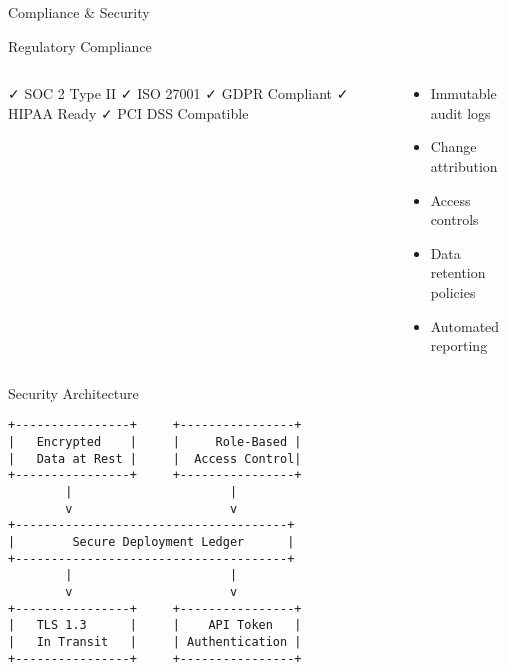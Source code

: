 \documentclass[presentation,aspectratio=169]{beamer}
\begin{document}
\begin{frame}[label={sec:org8612744},fragile]{Compliance \& Security}
 \begin{block}{Regulatory Compliance}
\begin{columns}
\begin{column}{0.5\columnwidth}
✓ SOC 2 Type II
✓ ISO 27001
✓ GDPR Compliant
✓ HIPAA Ready
✓ PCI DSS Compatible
\end{column}
\begin{column}{0.5\columnwidth}
\begin{itemize}
\item Immutable audit logs
\item Change attribution
\item Access controls
\item Data retention policies
\item Automated reporting
\end{itemize}
\end{column}
\end{columns}
\end{block}
\begin{block}{Security Architecture}
\begin{verbatim}
+----------------+     +----------------+
|   Encrypted    |     |     Role-Based |
|   Data at Rest |     |  Access Control|
+----------------+     +----------------+
        |                      |
        v                      v
+--------------------------------------+
|        Secure Deployment Ledger      |
+--------------------------------------+
        |                      |
        v                      v
+----------------+     +----------------+
|   TLS 1.3      |     |    API Token   |
|   In Transit   |     | Authentication |
+----------------+     +----------------+
\end{verbatim}
\end{block}
\end{frame}
\end{document}
